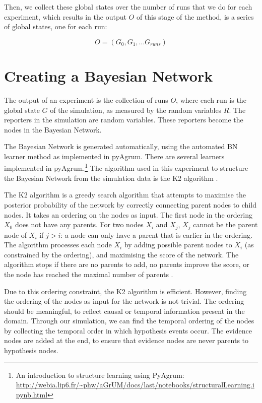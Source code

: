 Then, we collect these global states over the number of runs that we do for each experiment, which results in the output $O$ of this stage of the method, is a series of global states, one for each run:

\[ O = (G_0, G_1, ... G_{runs})\]



\section{Creating a Bayesian Network}

The output of an experiment is the collection of runs $O$, where each run is the global state $G$ of the simulation, as measured by the random variables $R$. The reporters in the simulation are random variables. These reporters become the nodes in the Bayesian Network.

The Bayesian Network is generated automatically, using the automated BN learner method as implemented in pyAgrum. There are several learners implemented in pyAgrum.\footnote{An introduction to structure learning using PyAgrum: \url{http://webia.lip6.fr/~phw/aGrUM/docs/last/notebooks/structuralLearning.ipynb.html}} The algorithm used in this experiment to structure the Bayesian Network from the simulation data is the K2 algorithm \citep{Cooper1992}. 

The K2 algorithm is a greedy search algorithm that attempts to maximise the posterior probability of the network by correctly connecting parent nodes to child nodes. It takes an ordering on the nodes as input. The first node in the ordering $X_0$ does not have any parents. For two nodes $X_i$ and $X_j$, $X_j$ cannot be the parent node of $X_i$ if $j > i$: a node can only have a parent that is earlier in the ordering. The algorithm processes each node $X_i$ by adding possible parent nodes to $X_i$ (as constrained by the ordering), and maximising the score of the network. The algorithm stops if there are no parents to add, no parents improve the score, or the node has reached the maximal number of parents \citep{Chen2008}.

Due to this ordering constraint, the K2 algorithm is efficient. However, finding the ordering of the nodes as input for the network is not trivial. The ordering should be meaningful, to reflect causal or temporal information present in the domain. Through our simulation, we can find the temporal ordering of the nodes by collecting the temporal order in which hypothesis events occur. The evidence nodes are added at the end, to ensure that evidence nodes are never parents to hypothesis nodes. 

